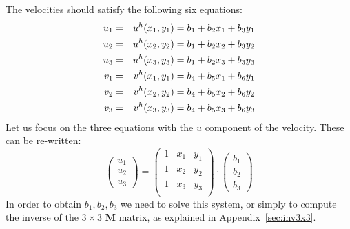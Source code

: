The velocities should satisfy the following six equations:
\begin{eqnarray}
u_1 &=& u^h(x_1,y_1)= b_1 + b_2x_1+b_3y_1 \nonumber\\
u_2 &=& u^h(x_2,y_2)= b_1 + b_2x_2+b_3y_2 \nonumber\\
u_3 &=& u^h(x_3,y_3)= b_1 + b_2x_3+b_3y_3 \nonumber\\
v_1 &=& v^h(x_1,y_1)= b_4 + b_5x_1+b_6y_1 \nonumber\\
v_2 &=& v^h(x_2,y_2)= b_4 + b_5x_2+b_6y_2 \nonumber\\
v_3 &=& v^h(x_3,y_3)= b_4 + b_5x_3+b_6y_3 \nonumber
\end{eqnarray}
Let us focus on the three equations with the $u$ component of the velocity.
These can be re-written:
\[
\left(
\begin{array}{c}
u_1 \\ u_2 \\ u_3  
\end{array}
\right)
=
\left(
\begin{array}{ccc}
1 & x_1 & y_1 \\
1 & x_2 & y_2 \\
1 & x_3 & y_3 \\
\end{array}
\right)
\cdot
\left(
\begin{array}{c}
b_1 \\ b_2 \\ b_3  
\end{array}
\right)
\]
In order to obtain $b_1,b_2,b_3$ we need to solve this system, or simply to compute the
inverse of the $3\times 3$ ${\bm M}$ matrix, as explained in Appendix~\ref{sec:inv3x3}.

